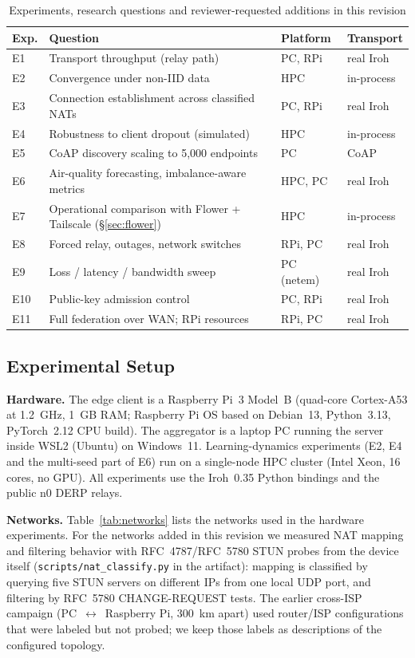 \documentclass[a4paper,fleqn]{cas-dc}
\begin{document}
\begin{table}[t]
\centering
\caption{Experiments, research questions and reviewer-requested additions in this revision}
\label{tab:explist}
\scriptsize
\setlength{\tabcolsep}{2.5pt}
\begin{tabular}{@{}l p{4.1cm} l l@{}}
\toprule
\textbf{Exp.} & \textbf{Question} & \textbf{Platform} & \textbf{Transport} \\
\midrule
E1 & Transport throughput (relay path) & PC, RPi & real Iroh \\
E2 & Convergence under non-IID data & HPC & in-process \\
E3 & Connection establishment across classified NATs & PC, RPi & real Iroh \\
E4 & Robustness to client dropout (simulated) & HPC & in-process \\
E5 & CoAP discovery scaling to 5{,}000 endpoints & PC & CoAP \\
E6 & Air-quality forecasting, imbalance-aware metrics & HPC, PC & real Iroh \\
E7 & Operational comparison with Flower + Tailscale (\S\ref{sec:flower}) & HPC & in-process \\
E8 & Forced relay, outages, network switches & RPi, PC & real Iroh \\
E9 & Loss / latency / bandwidth sweep & PC (netem) & real Iroh \\
E10 & Public-key admission control & PC, RPi & real Iroh \\
E11 & Full federation over WAN; RPi resources & RPi, PC & real Iroh \\
\bottomrule
\end{tabular}
\end{table}

\subsection{Experimental Setup}
\label{sec:setup}

\textbf{Hardware.} The edge client is a Raspberry Pi~3 Model~B (quad-core Cortex-A53 at 1.2~GHz, 1~GB RAM; Raspberry Pi OS based on Debian~13, Python~3.13, PyTorch~2.12 CPU build). The aggregator is a laptop PC running the server inside WSL2 (Ubuntu) on Windows~11. Learning-dynamics experiments (E2, E4 and the multi-seed part of E6) run on a single-node HPC cluster (Intel Xeon, 16 cores, no GPU). All experiments use the Iroh~0.35 Python bindings and the public n0 DERP relays.

\textbf{Networks.} Table~\ref{tab:networks} lists the networks used in the hardware experiments. For the networks added in this revision we measured NAT mapping and filtering behavior with RFC~4787/RFC~5780 STUN probes from the device itself (\texttt{scripts/nat\_classify.py} in the artifact): mapping is classified by querying five STUN servers on different IPs from one local UDP port, and filtering by RFC~5780 CHANGE-REQUEST tests. The earlier cross-ISP campaign (PC~$\leftrightarrow$~Raspberry Pi, 300~km apart) used router/ISP configurations that were labeled but not probed; we keep those labels as descriptions of the configured topology.
\end{document}
